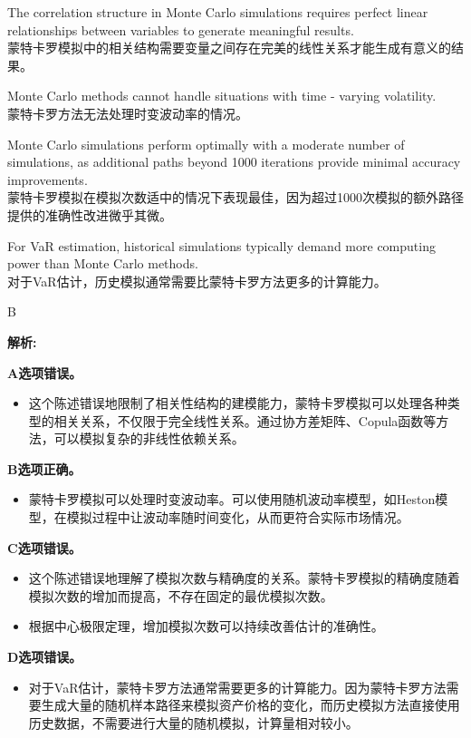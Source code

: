 \documentclass{article}
\newenvironment{explanation}
{\textbf{解析:}\par}
{\par}
\begin{document}
    \begin{choices}
        \item The correlation structure in Monte Carlo simulations requires perfect linear relationships between variables to generate meaningful results.\\
        蒙特卡罗模拟中的相关结构需要变量之间存在完美的线性关系才能生成有意义的结果。
        \item Monte Carlo methods cannot handle situations with time - varying volatility.\\
        蒙特卡罗方法无法处理时变波动率的情况。
        \item Monte Carlo simulations perform optimally with a moderate number of simulations, as additional paths beyond 1000 iterations provide minimal accuracy improvements.\\
        蒙特卡罗模拟在模拟次数适中的情况下表现最佳，因为超过1000次模拟的额外路径提供的准确性改进微乎其微。
        \item For VaR estimation, historical simulations typically demand more computing power than Monte Carlo methods.\\
        对于VaR估计，历史模拟通常需要比蒙特卡罗方法更多的计算能力。
    \end{choices}
        
    \begin{correctanswer}
        B
    \end{correctanswer}
        
    \begin{explanation}
    \textbf{A选项错误。}
    \begin{itemize}
        \item 这个陈述错误地限制了相关性结构的建模能力，蒙特卡罗模拟可以处理各种类型的相关关系，不仅限于完全线性关系。通过协方差矩阵、Copula函数等方法，可以模拟复杂的非线性依赖关系。
    \end{itemize}
    
    \textbf{B选项正确。}
    \begin{itemize}
        \item 蒙特卡罗模拟可以处理时变波动率。可以使用随机波动率模型，如Heston模型，在模拟过程中让波动率随时间变化，从而更符合实际市场情况。
    \end{itemize}
    
    \textbf{C选项错误。}
    \begin{itemize}
        \item 这个陈述错误地理解了模拟次数与精确度的关系。蒙特卡罗模拟的精确度随着模拟次数的增加而提高，不存在固定的最优模拟次数。
        \item 根据中心极限定理，增加模拟次数可以持续改善估计的准确性。
    \end{itemize}
    
    \textbf{D选项错误。}
    \begin{itemize}
        \item 对于VaR估计，蒙特卡罗方法通常需要更多的计算能力。因为蒙特卡罗方法需要生成大量的随机样本路径来模拟资产价格的变化，而历史模拟方法直接使用历史数据，不需要进行大量的随机模拟，计算量相对较小。
    \end{itemize}
    \end{explanation}
        
\end{document}
